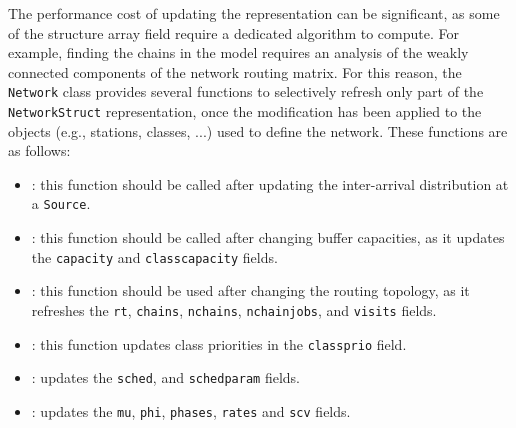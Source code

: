 The performance cost of updating the representation can be significant, as some of the structure array field require a dedicated algorithm to compute. For example, finding the chains in the model requires an analysis of the weakly connected components of the network routing matrix. For this reason, the \texttt{Network} class provides several functions to selectively refresh only part of the \texttt{NetworkStruct} representation, once the modification has been applied to the objects (e.g., stations, classes, ...) used to define the network. These functions are as follows:
\begin{itemize}
\item {}: this function should be called after updating the inter-arrival distribution at a \texttt{Source}. %
\item {}: this function should be called after changing buffer capacities, as it updates the \texttt{capacity} and \texttt{classcapacity} fields.
\item {}: this function should be used after changing the routing topology, as it refreshes the \texttt{rt}, \texttt{chains}, \texttt{nchains}, \texttt{nchainjobs}, and \texttt{visits} fields.
\item {}: this function updates class priorities in the \texttt{classprio} field.
\item {}: updates the \texttt{sched}, and \texttt{schedparam} fields.
\item {}: updates the \texttt{mu}, \texttt{phi}, \texttt{phases}, \texttt{rates} and \texttt{scv} fields.
\end{itemize}
